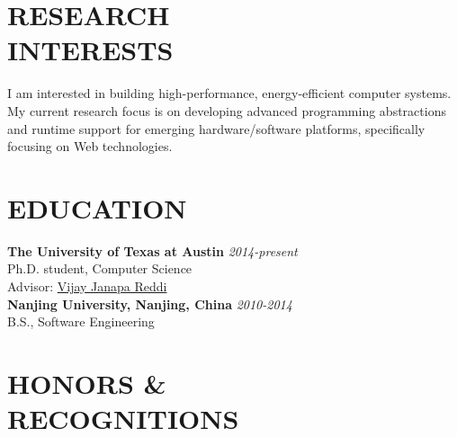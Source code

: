 \documentclass[margin, 9pt]{res} %
\begin{document}
\begin{resume}


\vspace*{-5pt}
\section{RESEARCH\\ INTERESTS} 

I am interested in building high-performance, energy-efficient computer systems. My current research focus is on developing advanced programming abstractions and runtime support for emerging hardware/software platforms, specifically focusing on Web technologies. 
 


\section{EDUCATION}

\textbf{The University of Texas at Austin} \hfill\textit{2014-present}\\
Ph.D. student, Computer Science\\
Advisor: \href{http://3nity.io/~vj/}{Vijay Janapa Reddi}\\

\vspace*{-5pt}
\textbf{Nanjing University, Nanjing, China} \hfill\textit{2010-2014}\\
B.S., Software Engineering

 
\section{HONORS \&\\ RECOGNITIONS}


\end{resume}
\end{document}
